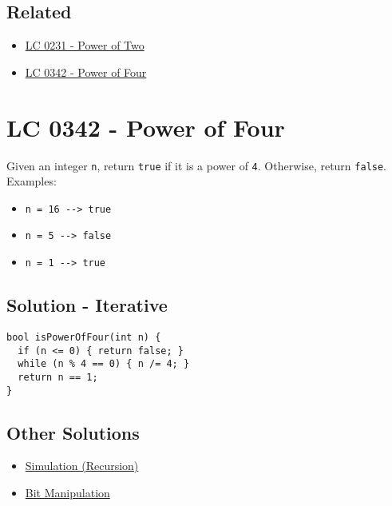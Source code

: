 \subsection*{Related}
\begin{itemize}
\item \hyperref[lc0231]{LC 0231 - Power of Two}
\item \hyperref[lc0342]{LC 0342 - Power of Four}
\end{itemize}

\section{LC 0342 - Power of Four}
Given an integer {\colorbox{CodeBackground}{\lstinline|n|}}, return {\colorbox{CodeBackground}{\lstinline|true|}} if it is a power of {\colorbox{CodeBackground}{\lstinline|4|}}. Otherwise, return {\colorbox{CodeBackground}{\lstinline|false|}}.\\

Examples:
\begin{itemize}
\item {\colorbox{CodeBackground}{\lstinline|n = 16 --> true|}}
\item {\colorbox{CodeBackground}{\lstinline|n = 5 --> false|}}
\item {\colorbox{CodeBackground}{\lstinline|n = 1 --> true|}}
\end{itemize}

\subsection*{Solution - Iterative}\label{solution:lc0342_simulation_iterative}
\begin{lstlisting}
bool isPowerOfFour(int n) {
  if (n <= 0) { return false; }
  while (n % 4 == 0) { n /= 4; }
  return n == 1;
}
\end{lstlisting}

\subsection*{Other Solutions}
\begin{itemize}
\item \hyperref[solution:lc0342_simulation_recursion]{Simulation (Recursion)}
\item \hyperref[solution:lc0342_bit_manipulation]{Bit Manipulation}
\end{itemize}

